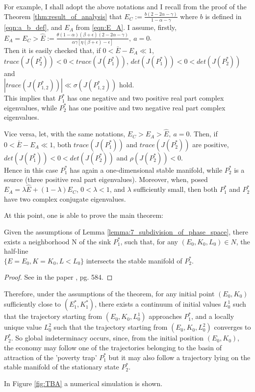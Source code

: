 For example, I shall adopt the above notations and I recall from the proof of the Theorem \ref{thm:result_of_analysis} that $E_C := \frac{b(2-2\alpha-\gamma)}{1-\alpha-\gamma}$ where $b$ is defined in \eqref{eqn:a_b_def}, and $E_A$ from \eqref{eqn:E_A}. I assume, firstly, 
$E_A=E_C>\widehat{E}:=\frac{\theta(1-\alpha)(\beta+\epsilon)(2-2\alpha-\gamma)}{\alpha\gamma[\eta(\beta+\epsilon)-\epsilon]},\ a=0$.\\
Then it is easily checked that, if $0<\bar{E}-E_A\ll 1$, \\
$trace(J(P_2^*))<0<trace(J(P_1^*))$, $det(J(P_1^*))<0<det(J(P_2^*))$ and\\
$|trace(J(P_{1,2}^*))|\ll \sigma(J(P_{1,2}^*))$ hold.\\
This implies that $P_1^*$ has one negative and two positive real part complex eigenvalues, while $P_2^*$ has one positive and two negative real part complex eigenvalues.

Vice versa, let, with the same notations, $E_C>E_A>\widehat{E},\ a=0.$ Then, if $0<\bar{E}-E_A\ll 1$, both $trace(J(P_1^*))$ and $trace(J(P_2^*))$ are positive,\\ $det(J(P_1^*))<0<det(J(P_2^*))$ and $\rho(J(P_2^*))<0$.\\
Hence in this case $P_1^*$ has again a one-dimensional stable manifold, while $P_2^*$ is a source (three positive real part eigenvalues). Moreover, when, posed $E_A=\lambda\widehat{E}+(1-\lambda)E_C$, $0<\lambda<1$, and $\lambda$ sufficiently small, then both $P_1^*$ and $P_2^*$ have two complex conjugate eigenvalues.

At this point, one is able to prove the main theorem: 
\begin{thm}\label{thm:10_neighbor_of_P1_inters_manifold_P2}
	Given the assumptions of Lemma \ref{lemma:7_subdivision_of_phase_space}, there exists a neighborhood N of the sink $P_1^*$, such that, for any $(E_0,K_0,L_0)\in N$, the half-line \\$\{E=E_0,K = K_0,L < L_0\}$ intersects the stable manifold of $P_2^*$.
\end{thm}
\begin{proof}
	See in the paper \cite{antoci_poverty_2011}, pg. 584. 
\end{proof}
Therefore, under the assumptions of the theorem, for any initial point $(E_0, K_0)$ sufficiently close to $(E_1^*, K_1^*)$, there exists a continuum of initial values $L_0^1$ such that the trajectory starting from $(E_0, K_0, L_0^1)$ approaches $P_1^*$, and a locally unique value $L_0^2$ such that the trajectory starting from $(E_0, K_0,L_0^2)$ converges to $P_2^*$. So global indeterminacy occurs, since, from the initial position $(E_0, K_0)$, the economy may follow one of the trajectories belonging to the basin of attraction of the 'poverty trap' $P_1^*$ but it may also follow a trajectory lying on the stable manifold of the stationary state $P_2^*$.

In Figure \ref{fig:TBA} a numerical simulation is shown. 